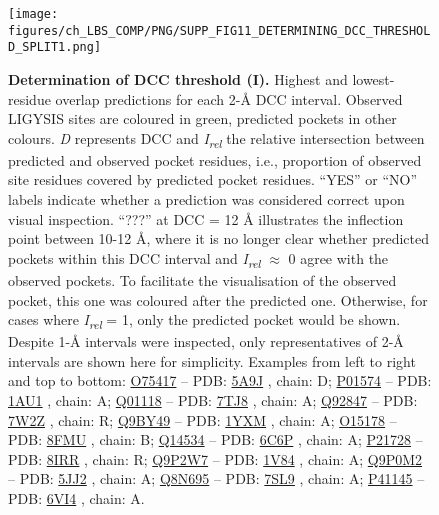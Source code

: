 \begin{figure}[p]
    \centering
    \texttt{[image: figures/ch\_LBS\_COMP/PNG/SUPP\_FIG11\_DETERMINING\_DCC\_THRESHOLD\_SPLIT1.png]}
    \caption[Determination of DCC threshold (I)]{\textbf{Determination of DCC threshold (I).} Highest and lowest-residue overlap predictions for each 2-\AA{} DCC interval. Observed LIGYSIS sites are coloured in green, predicted pockets in other colours. \textit{D} represents DCC and \textit{I\textsubscript{rel}} the relative intersection between predicted and observed pocket residues, i.e., proportion of observed site residues covered by predicted pocket residues. ``YES'' or ``NO'' labels indicate whether a prediction was considered correct upon visual inspection. ``???'' at DCC = 12 \AA{} illustrates the inflection point between 10-12 \AA{}, where it is no longer clear whether predicted pockets within this DCC interval and \textit{I\textsubscript{rel}} $\approx$ 0 agree with the observed pockets. To facilitate the visualisation of the observed pocket, this one was coloured after the predicted one. Otherwise, for cases where \textit{I\textsubscript{rel}} = 1, only the predicted pocket would be shown. Despite 1-\AA{} intervals were inspected, only representatives of 2-\AA{} intervals are shown here for simplicity. Examples from left to right and top to bottom: \href{https://www.uniprot.org/uniprotkb/O75417/entry}{O75417} -- PDB: \href{https://www.ebi.ac.uk/pdbe/entry/pdb/5A9J}{5A9J} \cite{NEWMAN_2015_POLYMERASE}, chain: D; \href{https://www.uniprot.org/uniprotkb/P01574/entry}{P01574} -- PDB: \href{https://www.ebi.ac.uk/pdbe/entry/pdb/1AU1}{1AU1} \cite{KARPUSAS_1997_INTERFERON}, chain: A; \href{https://www.uniprot.org/uniprotkb/Q01118/entry}{Q01118} -- PDB: \href{https://www.ebi.ac.uk/pdbe/entry/pdb/7TJ8}{7TJ8} \cite{NOLAND_2022_NAX}, chain: A; \href{https://www.uniprot.org/uniprotkb/Q92847/entry}{Q92847} -- PDB: \href{https://www.ebi.ac.uk/pdbe/entry/pdb/7W2Z}{7W2Z} \cite{QIN_2022_GHRELIN}, chain: R; \href{https://www.uniprot.org/uniprotkb/Q9BY49/entry}{Q9BY49} -- PDB: \href{https://www.ebi.ac.uk/pdbe/entry/pdb/1YXM}{1YXM} \cite{PDB_1YXM}, chain: A; \href{https://www.uniprot.org/uniprotkb/O15178/entry}{O15178} -- PDB: \href{https://www.ebi.ac.uk/pdbe/entry/pdb/8FMU}{8FMU} \cite{CHASE_2024_BRACHYURY}, chain: B; \href{https://www.uniprot.org/uniprotkb/Q14534/entry}{Q14534} -- PDB: \href{https://www.ebi.ac.uk/pdbe/entry/pdb/6C6P}{6C6P} \cite{PADYANA_2019_EPOXIDASE}, chain: A; \href{https://www.uniprot.org/uniprotkb/P21728/entry}{P21728} -- PDB: \href{https://www.ebi.ac.uk/pdbe/entry/pdb/8IRR}{8IRR} \cite{XU_2023_DOPAMINE}, chain: R; \href{https://www.uniprot.org/uniprotkb/Q9P2W7/entry}{Q9P2W7} -- PDB: \href{https://www.ebi.ac.uk/pdbe/entry/pdb/1V84}{1V84} \cite{KAKUDA_2004_GLCATP}, chain: A; \href{https://www.uniprot.org/uniprotkb/Q9P0M2/entry}{Q9P0M2} -- PDB: \href{https://www.ebi.ac.uk/pdbe/entry/pdb/5JJ2}{5JJ2} \cite{BJERREGAARD_2016_AKAP18}, chain: A; \href{https://www.uniprot.org/uniprotkb/Q8N695/entry}{Q8N695} -- PDB: \href{https://www.ebi.ac.uk/pdbe/entry/pdb/7SL9}{7SL9} \cite{HAN_2022_SGLT}, chain: A; \href{https://www.uniprot.org/uniprotkb/P41145/entry}{P41145} -- PDB: \href{https://www.ebi.ac.uk/pdbe/entry/pdb/6VI4}{6VI4} \cite{CHE_2020_NANOBODY}, chain: A.}
    \label{fig:DCC_determination1}
\end{figure}

